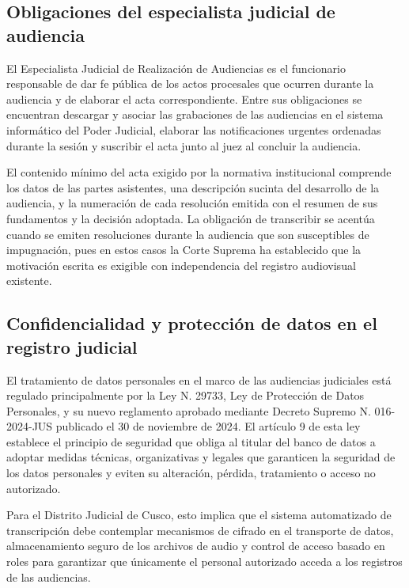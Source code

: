 \documentclass[12pt,a4paper,oneside]{article}
\begin{document}
\subsection{Obligaciones del especialista judicial de audiencia}

El Especialista Judicial de Realizaci\'on de Audiencias es el funcionario responsable de dar fe p\'ublica de los actos procesales que ocurren durante la audiencia y de elaborar el acta correspondiente. Entre sus obligaciones se encuentran descargar y asociar las grabaciones de las audiencias en el sistema inform\'atico del Poder Judicial, elaborar las notificaciones urgentes ordenadas durante la sesi\'on y suscribir el acta junto al juez al concluir la audiencia.

El contenido m\'inimo del acta exigido por la normativa institucional comprende los datos de las partes asistentes, una descripci\'on sucinta del desarrollo de la audiencia, y la numeraci\'on de cada resoluci\'on emitida con el resumen de sus fundamentos y la decisi\'on adoptada. La obligaci\'on de transcribir se acent\'ua cuando se emiten resoluciones durante la audiencia que son susceptibles de impugnaci\'on, pues en estos casos la Corte Suprema ha establecido que la motivaci\'on escrita es exigible con independencia del registro audiovisual existente.

\subsection{Confidencialidad y protecci\'on de datos en el registro judicial}

El tratamiento de datos personales en el marco de las audiencias judiciales est\'a regulado principalmente por la Ley N.\textordmasculine{} 29733, Ley de Protecci\'on de Datos Personales, y su nuevo reglamento aprobado mediante Decreto Supremo N.\textordmasculine{} 016-2024-JUS publicado el 30 de noviembre de 2024. El art\'iculo 9 de esta ley establece el principio de seguridad que obliga al titular del banco de datos a adoptar medidas t\'ecnicas, organizativas y legales que garanticen la seguridad de los datos personales y eviten su alteraci\'on, p\'erdida, tratamiento o acceso no autorizado.

Para el Distrito Judicial de Cusco, esto implica que el sistema automatizado de transcripci\'on debe contemplar mecanismos de cifrado en el transporte de datos, almacenamiento seguro de los archivos de audio y control de acceso basado en roles para garantizar que \'unicamente el personal autorizado acceda a los registros de las audiencias.
\end{document}
